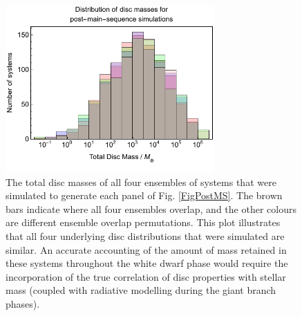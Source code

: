 \documentclass[useAMS,usenatbib]{mn2e}
\newcommand{\rev}{ }
\begin{document}
\begin{figure}
\includegraphics[width=8cm]{MassHist}
\caption{
{\rev
The total disc masses of all four ensembles of systems that were simulated to generate each panel of Fig. \ref{FigPostMS}. The brown bars indicate where all four ensembles overlap, and the other colours are different ensemble overlap permutations. This plot illustrates that all four underlying disc distributions that were simulated are similar. An accurate accounting of the amount of mass retained in these systems throughout the white dwarf phase would require the incorporation of the true correlation of disc properties with stellar mass (coupled with radiative modelling during the giant branch phases).
}
}
\label{MassHist}
\end{figure}
\end{document}
